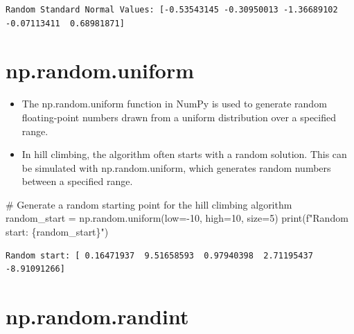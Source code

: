 \documentclass[
  letterpaper,
  DIV=11,
  numbers=noendperiod]{scrreprt}
\newenvironment{Shaded}{\begin{snugshade}}{\end{snugshade}}
\newcommand{\BuiltInTok}[1]{\textcolor[rgb]{0.00,0.23,0.31}{#1}}
\newcommand{\CommentTok}[1]{\textcolor[rgb]{0.37,0.37,0.37}{#1}}
\newcommand{\DecValTok}[1]{\textcolor[rgb]{0.68,0.00,0.00}{#1}}
\newcommand{\NormalTok}[1]{\textcolor[rgb]{0.00,0.23,0.31}{#1}}
\newcommand{\OperatorTok}[1]{\textcolor[rgb]{0.37,0.37,0.37}{#1}}
\newcommand{\SpecialCharTok}[1]{\textcolor[rgb]{0.37,0.37,0.37}{#1}}
\newcommand{\SpecialStringTok}[1]{\textcolor[rgb]{0.13,0.47,0.30}{#1}}
\providecommand{\tightlist}{%
  \setlength{\itemsep}{0pt}\setlength{\parskip}{0pt}}\usepackage{longtable,booktabs,array}
\begin{document}
\begin{verbatim}
Random Standard Normal Values: [-0.53543145 -0.30950013 -1.36689102 -0.07113411  0.68981871]
\end{verbatim}

\section{np.random.uniform}\label{np.random.uniform}

\begin{itemize}
\tightlist
\item
  The np.random.uniform function in NumPy is used to generate random
  floating-point numbers drawn from a uniform distribution over a
  specified range.
\item
  In hill climbing, the algorithm often starts with a random solution.
  This can be simulated with np.random.uniform, which generates random
  numbers between a specified range.
\end{itemize}

\begin{Shaded}
\begin{Highlighting}[]
\CommentTok{\# Generate a random starting point for the hill climbing algorithm}
\NormalTok{random\_start }\OperatorTok{=}\NormalTok{ np.random.uniform(low}\OperatorTok{={-}}\DecValTok{10}\NormalTok{, high}\OperatorTok{=}\DecValTok{10}\NormalTok{, size}\OperatorTok{=}\DecValTok{5}\NormalTok{)}
\BuiltInTok{print}\NormalTok{(}\SpecialStringTok{f"Random start: }\SpecialCharTok{\{}\NormalTok{random\_start}\SpecialCharTok{\}}\SpecialStringTok{"}\NormalTok{)}
\end{Highlighting}
\end{Shaded}

\begin{verbatim}
Random start: [ 0.16471937  9.51658593  0.97940398  2.71195437 -8.91091266]
\end{verbatim}

\section{np.random.randint}\label{np.random.randint}
\end{document}
